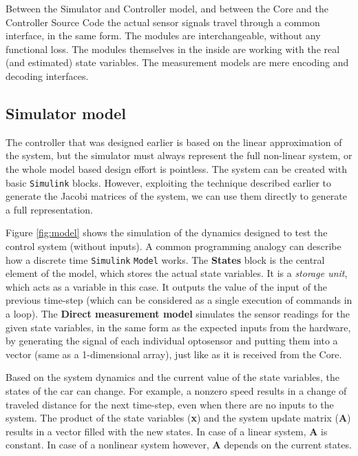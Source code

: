 Between the Simulator and Controller model, and between the Core and the Controller Source Code the actual sensor signals travel through a common interface, in the same form. The modules are interchangeable, without any functional loss. The modules themselves in the inside are working with the real (and estimated) state variables. The measurement models are mere encoding and decoding interfaces.


\subsection{Simulator model}

The controller that was designed earlier is based on the linear approximation of the system, but the simulator must always represent the full non-linear system, or the whole model based design effort is pointless. The system can be created with basic \verb!Simulink! blocks. However, exploiting the technique described earlier to generate the Jacobi matrices of the system, we can use them directly to generate a full representation.

Figure \ref{fig:model} shows the simulation of the dynamics designed to test the control system (without inputs). A common programming analogy can describe how a discrete time \verb!Simulink! \verb!Model! works. The \textbf{States} block is the central element of the model, which stores the actual state variables. It is a \emph{storage unit}, which acts as a variable in this case. It outputs the value of the input of the previous time-step (which can be considered as a single execution of commands in a loop). The \textbf{Direct measurement model} simulates the sensor readings for the given state variables, in the same form as the expected inputs from the hardware, by generating the signal of each individual optosensor and putting them into a vector (same as a 1-dimensional array), just like as it is received from the Core.

Based on the system dynamics and the current value of the state variables, the states of the car can change. For example, a nonzero speed results in a change of traveled distance for the next time-step, even when there are no inputs to the system. The product of the state variables (\textbf{x}) and the system update matrix (\textbf{A}) results in a vector filled with the new states. In case of a linear system, \textbf{A} is constant. In case of a nonlinear system however, \textbf{A} depends on the current states. 

